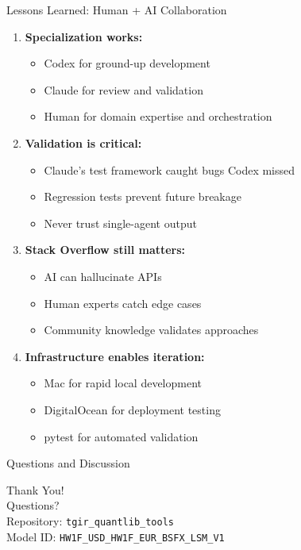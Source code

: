 \documentclass[aspectratio=169,11pt]{beamer}
\begin{document}
\begin{frame}{Lessons Learned: Human + AI Collaboration}
\begin{enumerate}
    \item \textbf{Specialization works:}
    \begin{itemize}
        \item Codex for ground-up development
        \item Claude for review and validation
        \item Human for domain expertise and orchestration
    \end{itemize}

    \item \textbf{Validation is critical:}
    \begin{itemize}
        \item Claude's test framework caught bugs Codex missed
        \item Regression tests prevent future breakage
        \item Never trust single-agent output
    \end{itemize}

    \item \textbf{Stack Overflow still matters:}
    \begin{itemize}
        \item AI can hallucinate APIs
        \item Human experts catch edge cases
        \item Community knowledge validates approaches
    \end{itemize}

    \item \textbf{Infrastructure enables iteration:}
    \begin{itemize}
        \item Mac for rapid local development
        \item DigitalOcean for deployment testing
        \item pytest for automated validation
    \end{itemize}
\end{enumerate}
\end{frame}

\begin{frame}{Questions and Discussion}
\begin{center}
\Huge Thank You!\\[1cm]
\Large Questions?\\[1cm]
\normalsize
Repository: \texttt{tgir\_quantlib\_tools}\\
Model ID: \texttt{HW1F\_USD\_HW1F\_EUR\_BSFX\_LSM\_V1}
\end{center}
\end{frame}
\end{document}
